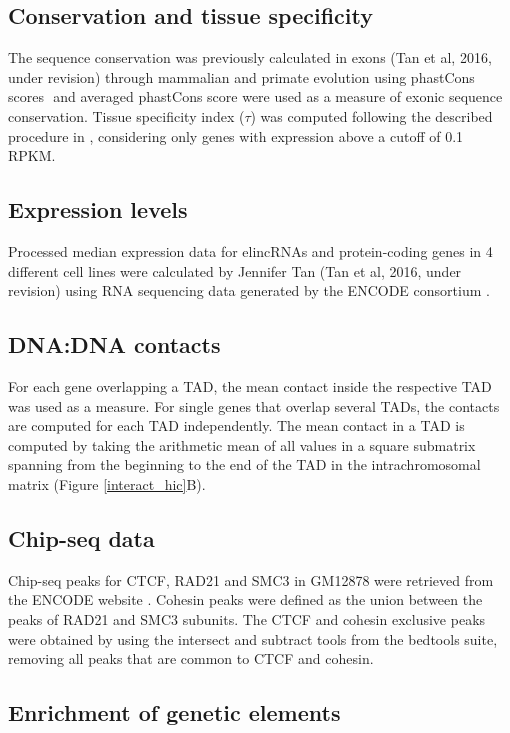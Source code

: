 \documentclass[11pt,a4paper]{report}
\begin{document}
\subsection*{Conservation and tissue specificity}

The sequence conservation was previously calculated in exons (Tan et al, 2016, under revision) through mammalian and primate evolution using phastCons scores \cite{Siepel2005}⁠ and averaged phastCons score were used as a measure of exonic sequence conservation. Tissue specificity index ($\tau$) was computed following the described procedure in \cite{Kryuchkova2015a}, considering only genes with expression above a cutoff of 0.1 RPKM.

\subsection*{Expression levels}

Processed median expression data for elincRNAs and protein-coding genes in 4  different cell lines were calculated by Jennifer Tan (Tan et al, 2016, under revision) using RNA sequencing data generated by the ENCODE consortium \cite{ENCODEProject2012}.

\subsection*{DNA:DNA contacts}

For each gene overlapping a TAD, the mean contact inside the respective TAD was used as a measure. For single genes that overlap several TADs, the contacts are computed for each TAD independently. The mean contact in a TAD is computed by taking the arithmetic mean of all values in a square submatrix spanning from the beginning to the end of the TAD in the intrachromosomal matrix (Figure \ref{interact_hic}B).

\subsection*{Chip-seq data}

Chip-seq peaks for CTCF, RAD21 and SMC3 in GM12878 were retrieved from the ENCODE website \cite{ENCODEProject2012}⁠. Cohesin peaks were defined as the union between the peaks of RAD21 and SMC3 subunits. The CTCF and cohesin exclusive peaks were obtained by using the intersect and subtract tools from the bedtools suite, removing all peaks that are common to CTCF and cohesin.

\subsection*{Enrichment of genetic elements}
\end{document}
